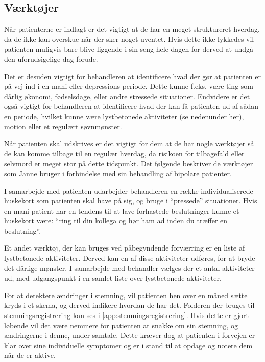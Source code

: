 \subsection{Værktøjer}
Når patienterne er indlagt er det vigtigt at de har en meget struktureret hverdag, da de ikke kan overskue når der sker noget uventet.
Hvis dette ikke lykkedes vil patienten muligvis bare blive liggende i sin seng hele dagen for derved at undgå den uforudsigelige dag forude.

Det er desuden vigtigt for behandleren at identificere hvad der gør at patienten er på vej ind i en mani eller depressions-periode.
Dette kunne f.eks. være ting som dårlig økonomi, fødselsdage, eller andre stressede situationer.
Endvidere er det også vigtigt for behandleren at identificere hvad der kan få patienten ud af sådan en periode, hvilket kunne være lystbetonede aktiviteter (se nedenunder her), motion eller et regulært søvnmønster.

Når patienten skal udskrives er det vigtigt for dem at de har nogle værktøjer så de kan komme tilbage til en regulær hverdag, da risikoen for tilbagefald eller selvmord er meget stor på dette tidspunkt. 
Det følgende beskriver de værktøjer som Janne bruger i forbindelse med sin behandling af bipolare patienter.
\begin{description}[style=nextline]
	\item[Huskekort] I samarbejde med patienten udarbejder behandleren en række individualiserede huskekort som patienten skal have på sig, og bruge i ``pressede'' situationer. 
	Hvis en mani patient har en tendens til at lave forhastede beslutninger kunne et huskekort være: ``ring til din kollega og hør ham ad inden du træffer en beslutning''.
	
	\item[Lystbetonede aktiviteter] Et andet værktøj, der kan bruges ved påbegyndende forværring er en liste af lystbetonede aktiviteter.
	Derved kan en af disse aktiviteter udføres, for at bryde det dårlige mønster.
	I samarbejde med behandler vælges der et antal aktiviteter ud, med udgangspunkt i en samlet liste over lystbetonede aktiviteter.
	
	\item[Stemningsregistrering] For at detektere ændringer i stemning, vil patienten hen over en måned sætte kryds i et skema, og derved indikere hvordan de har det.
	Folderen der bruges til stemningsregistrering kan ses i \cref{app:stemningsregistrering}.
	Hvis dette er gjort løbende vil det være nemmere for patienten at snakke om sin stemning, og ændringerne i denne, under samtale.
	Dette kræver dog at patienten i forvejen er klar over sine individuelle symptomer og er i stand til at opdage og notere dem når de er aktive.
\end{description}

